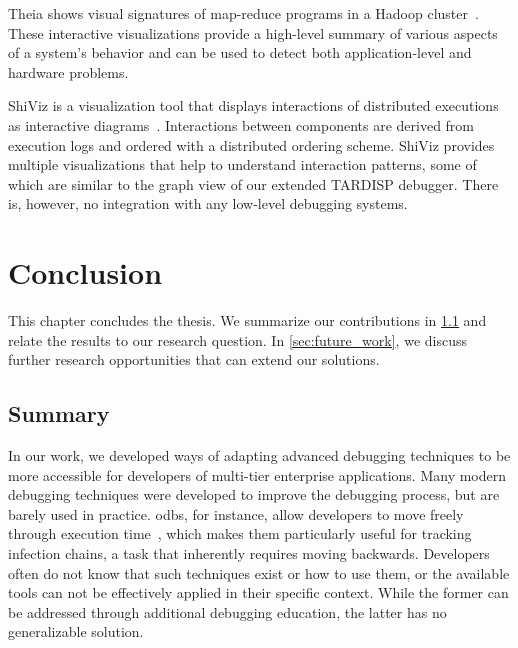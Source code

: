 Theia shows visual signatures of map-reduce programs in a Hadoop cluster~\cite{garduno12:theia_visual_signatures}.
These interactive visualizations provide a high-level summary of various aspects of a system's behavior and can be used to detect both application-level and hardware problems.

ShiViz is a visualization tool that displays interactions of distributed executions as interactive  diagrams~\cite{beschastnikh16:debugging_distributed_systems}. 
Interactions between components are derived from execution logs and ordered with a distributed ordering scheme.
ShiViz provides multiple visualizations that help to understand interaction patterns, some of which are similar to the graph view of our extended TARDISP debugger.
There is, however, no integration with any low-level debugging systems.


\chapter{Conclusion}
\label{sec:conclusion}

This chapter concludes the thesis.
We summarize our contributions in \cref{sec:summary} and relate the results to our research question.
In \cref{sec:future_work}, we discuss further research opportunities that can extend our solutions.

\section{Summary}
\label{sec:summary}


In our work, we developed ways of adapting advanced debugging techniques to be more accessible for developers of multi-tier enterprise applications.
%
Many modern debugging techniques were developed to improve the debugging process, but are barely used in practice.
\Acfp{odb}, for instance, allow developers to move freely through execution time~\cite{lewis03:debugging_backwards_in_time}, which makes them particularly useful for tracking infection chains, a task that inherently requires moving backwards.
Developers often do not know that such techniques exist or how to use them, or the available tools can not be effectively applied in their specific context.
While the former can be addressed through additional debugging education, the latter has no generalizable solution.

